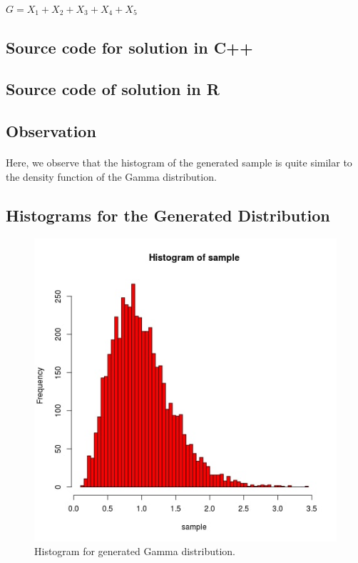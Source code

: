 \documentclass{article}
\begin{document}
		\paragraph{}
		$G = X_1 + X_2 + X_3 + X_4 + X_5$
		
		\subsection{Source code for solution in C++}
		
	
	\subsection{Source code of solution in R}
		
		
	\pagebreak
		\subsection{Observation}
		\paragraph{}
			Here, we observe that the histogram of the generated sample is quite similar to the density function of the Gamma distribution.
			
		\subsection{Histograms for the Generated Distribution}
		\begin{figure}[!hb]
  			\includegraphics[width=\linewidth]{pic/que2_in_R.jpg}
 			 \caption{Histogram for generated Gamma distribution. }
			\label{fig:hist2}
		\end{figure}
		
\end{document}

